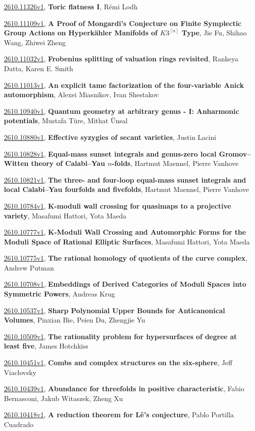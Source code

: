\documentclass[9pt, a4paper]{article}
\theoremstyle{plain}
\theoremstyle{definition}
\theoremstyle{remark}
\newcommand{\arxiv}[3]{\href{https://arxiv.org/abs/#1}{#1}, \textbf{\textcolor{arxivblue}{#2}}, #3}
\begin{document}
\arxiv{2610.11326v1}{Toric flatness I}{Rémi Lodh}

\arxiv{2610.11109v1}{A Proof of Mongardi's Conjecture on Finite Symplectic Group Actions on Hyperkähler Manifolds of $K3^{[n]}$ Type}{Jie Fu, Shihao Wang, Zhiwei Zheng}

\arxiv{2610.11032v1}{Frobenius splitting of valuation rings revisited}{Rankeya Datta, Karen E. Smith}

\arxiv{2610.11013v1}{An explicit tame factorization of the four-variable Anick automorphism}{Alexei Miasnikov, Ivan Shestakov}

\arxiv{2610.10940v1}{Quantum geometry at arbitrary genus - I: Anharmonic potentials}{Mustafa Türe, Mithat Ünsal}

\arxiv{2610.10880v1}{Effective syzygies of secant varieties}{Justin Lacini}

\arxiv{2610.10828v1}{Equal-mass sunset integrals and genus-zero local Gromov--Witten theory of Calabi--Yau $n$-folds}{Hartmut Maennel, Pierre Vanhove}

\arxiv{2610.10821v1}{The three- and four-loop equal-mass sunset integrals and local Calabi--Yau fourfolds and fivefolds}{Hartmut Maennel, Pierre Vanhove}

\arxiv{2610.10784v1}{K-moduli wall crossing for quasimaps to a projective variety}{Masafumi Hattori, Yota Maeda}

\arxiv{2610.10777v1}{K-Moduli Wall Crossing and Automorphic Forms for the Moduli Space of Rational Elliptic Surfaces}{Masafumi Hattori, Yota Maeda}

\arxiv{2610.10775v1}{The rational homology of quotients of the curve complex}{Andrew Putman}

\arxiv{2610.10708v1}{Embeddings of Derived Categories of Moduli Spaces into Symmetric Powers}{Andreas Krug}

\arxiv{2610.10537v1}{Sharp Polynomial Upper Bounds for Anticanonical Volumes}{Pinxian Bie, Peien Du, Zhengjie Yu}

\arxiv{2610.10509v1}{The rationality problem for hypersurfaces of degree at least five}{James Hotchkiss}

\arxiv{2610.10451v1}{Combs and complex structures on the six-sphere}{Jeff Viaclovsky}

\arxiv{2610.10439v1}{Abundance for threefolds in positive characteristic}{Fabio Bernasconi, Jakub Witaszek, Zheng Xu}

\arxiv{2610.10418v1}{A reduction theorem for Lê's conjecture}{Pablo Portilla Cuadrado}
\end{document}
